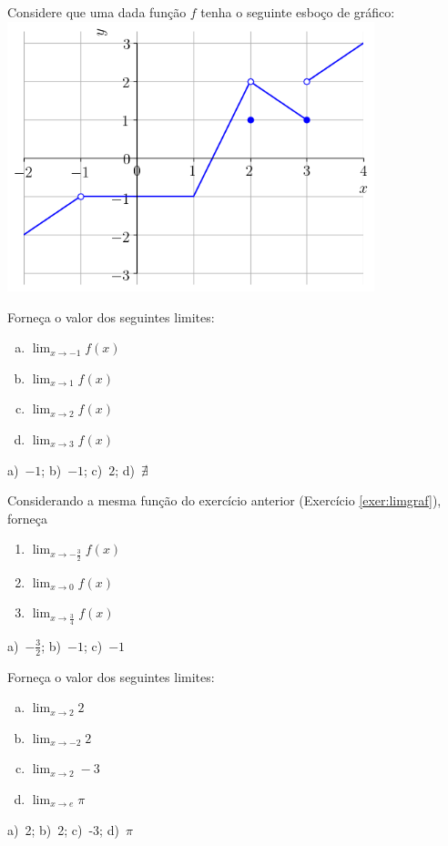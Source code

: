 \begin{exer}\label{exer:limgraf}
  Considere que uma dada função $f$ tenha o seguinte esboço de gráfico:
  \includegraphics[width=0.8\textwidth]{./cap_lim/dados/fig_exer_limgraf/fig_exer_limgraf}

  Forneça o valor dos seguintes limites:
  \begin{enumerate}[a)]
  \item $\displaystyle \lim_{x\to -1} f(x)$
  \item $\displaystyle \lim_{x\to 1} f(x)$
  \item $\displaystyle \lim_{x\to 2} f(x)$
  \item $\displaystyle \lim_{x\to 3} f(x)$
  \end{enumerate}
\end{exer}
\begin{resp}
  a)~$-1$; b)~$-1$; c)~$2$; d)~$\nexists$
\end{resp}

\begin{exer}
  Considerando a mesma função do exercício anterior (Exercício \ref{exer:limgraf}), forneça
  \begin{enumerate}
  \item $\displaystyle \lim_{x\to -\frac{3}{2}} f(x)$
  \item $\displaystyle \lim_{x\to 0} f(x)$
  \item $\displaystyle \lim_{x\to \frac{3}{4}} f(x)$
  \end{enumerate}
\end{exer}
\begin{resp}
  a)~$-\frac{3}{2}$; b)~$-1$; c)~$-1$
\end{resp}

\begin{exer}
  Forneça o valor dos seguintes limites:
  \begin{enumerate}[a)]
  \item $\displaystyle \lim_{x\to 2} 2$
  \item $\displaystyle \lim_{x\to -2} 2$
  \item $\displaystyle \lim_{x\to 2} -3$
  \item $\displaystyle \lim_{x\to e} \pi$
  \end{enumerate}
\end{exer}
\begin{resp}
  a)~2; b)~2; c)~-3; d)~$\pi$
\end{resp}

